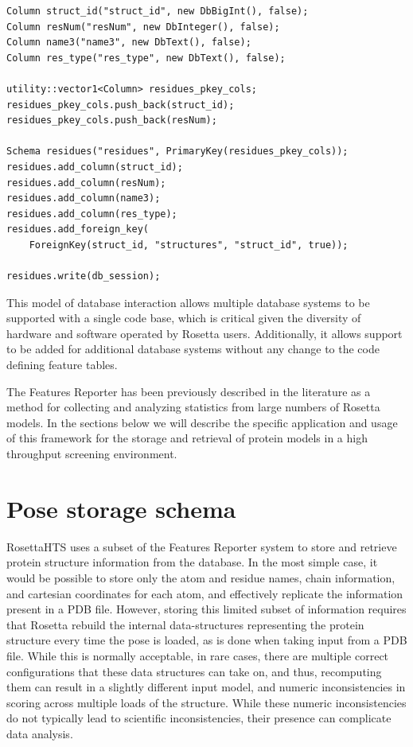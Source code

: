 \singlespace
\begin{Verbatim}
Column struct_id("struct_id", new DbBigInt(), false);
Column resNum("resNum", new DbInteger(), false);
Column name3("name3", new DbText(), false);
Column res_type("res_type", new DbText(), false);

utility::vector1<Column> residues_pkey_cols;
residues_pkey_cols.push_back(struct_id);
residues_pkey_cols.push_back(resNum);

Schema residues("residues", PrimaryKey(residues_pkey_cols));
residues.add_column(struct_id);
residues.add_column(resNum);
residues.add_column(name3);
residues.add_column(res_type);
residues.add_foreign_key(
	ForeignKey(struct_id, "structures", "struct_id", true));

residues.write(db_session);
\end{Verbatim}
\doublespace

This model of database interaction allows multiple database systems to be supported with a single code base, which is critical given the diversity of hardware and software operated by Rosetta users.
Additionally, it allows support to be added for additional database systems without any change to the code defining feature tables. 

The Features Reporter has been previously described in the literature\citep{LeaverFay:2013fn} as a method for collecting and analyzing statistics from large numbers of Rosetta models.  
In the sections below we will describe the specific application and usage of this framework for the storage and retrieval of protein models in a high throughput screening environment. 

\section{Pose storage schema}

RosettaHTS uses a subset of the Features Reporter system to store and retrieve protein structure information from the database.
In the most simple case, it would be possible to store only the atom and residue names, chain information, and cartesian coordinates for each atom, and effectively replicate the information present in a \ac{PDB} file.
However, storing this limited subset of information requires that Rosetta rebuild the internal data-structures representing the protein structure every time the pose is loaded, as is done when taking input from a \ac{PDB} file.
While this is normally acceptable, in rare cases, there are multiple correct configurations that these data structures can take on, and thus, recomputing them can result in a slightly different input model, and numeric inconsistencies in scoring across multiple loads of the structure.
While these  numeric inconsistencies do not typically lead to scientific inconsistencies, their presence can complicate data analysis.

